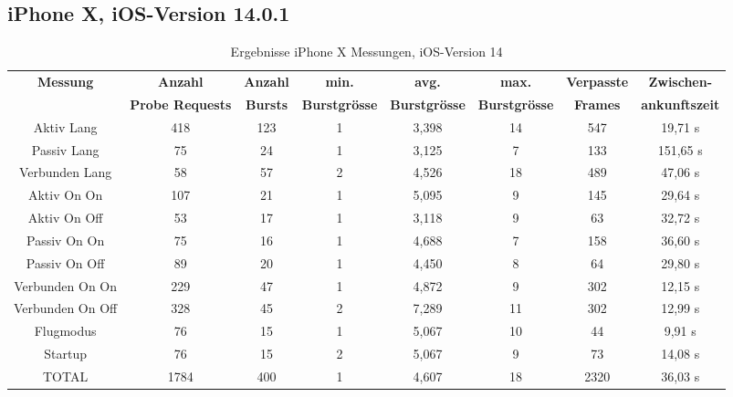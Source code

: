 \begin{landscape}
   \subsection*{iPhone X, iOS-Version 14.0.1}
   \begin{table}[h!]
      \centering
      \begin{tabular}{|c|c|c|c|c|c|c|c|}
      \hline
      \textbf{Messung} & \textbf{Anzahl} & \textbf{Anzahl} & \textbf{min.} & \textbf{avg.} & \textbf{max.} & \textbf{Verpasste} & \textbf{Zwischen-}\\
      & \textbf{Probe Requests} & \textbf{Bursts} & \textbf{Burstgrösse} & \textbf{Burstgrösse} & \textbf{Burstgrösse} & \textbf{Frames} & \textbf{ankunftszeit}\\
      \hline
      Aktiv Lang  & \phantom{0}418 & 123 & 1 & 3,398 & 14 & \phantom{0}547 & \phantom{0}19,71 s \\
      Passiv Lang & \phantom{00}75 & \phantom{0}24 & 1 & 3,125 & \phantom{0}7 & \phantom{0}133 & 151,65 s \\
      Verbunden Lang & \phantom{00}58 & \phantom{0}57 & 2 & 4,526 & 18 & \phantom{0}489 & \phantom{0}47,06 s \\
      Aktiv On On & \phantom{0}107 & \phantom{0}21 & 1 & 5,095 & \phantom{0}9 & \phantom{0}145 & \phantom{0}29,64 s \\
      Aktiv On Off & \phantom{00}53 & \phantom{0}17 & 1 & 3,118 & \phantom{0}9 & \phantom{00}63 & \phantom{0}32,72 s \\
      Passiv On On & \phantom{00}75 & \phantom{0}16 & 1 & 4,688 & \phantom{0}7 & \phantom{0}158 & \phantom{0}36,60 s \\
      Passiv On Off & \phantom{00}89 & \phantom{0}20 & 1 & 4,450 & \phantom{0}8 & \phantom{00}64 & \phantom{0}29,80 s \\
      Verbunden On On & \phantom{0}229 & \phantom{0}47 & 1 & 4,872 & \phantom{0}9 & \phantom{0}302 & \phantom{0}12,15 s \\
      Verbunden On Off & \phantom{0}328 & \phantom{0}45 & 2 & 7,289 & 11 & \phantom{0}302 & \phantom{0}12,99 s \\
      Flugmodus & \phantom{00}76 & \phantom{0}15 & 1 & 5,067 & 10 & \phantom{00}44 & \phantom{00}9,91 s \\
      Startup & \phantom{00}76 & \phantom{0}15 & 2 & 5,067 & \phantom{0}9 & \phantom{00}73 & \phantom{0}14,08 s \\
      \hline
      TOTAL & 1784 & 400 & 1 & 4,607 & 18 & 2320 & \phantom{0}36,03 s \\
      \hline
      \end{tabular}
      \caption{Ergebnisse iPhone X Messungen, iOS-Version 14
      \label{table:iphoneX-14-results}} 
   \end{table}


\end{landscape}

